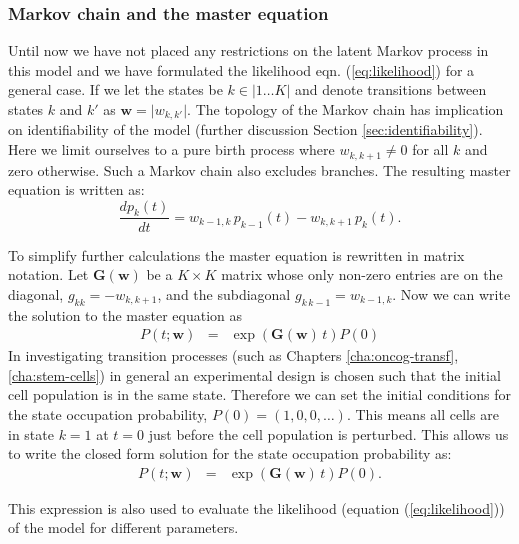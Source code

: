 \subsubsection{Markov chain and the master equation}
\label{sec:markov-chain-master}

Until now we have not placed any restrictions on the latent Markov process in this model and we have formulated the
likelihood eqn. (\ref{eq:likelihood}) for a general case. If we let the states be $k \in \lvert 1 \ldots K \rvert$ and denote transitions between states $k$ and $k'$ as $\mathbf{w} = \lvert w_{k,k'} \rvert$. 
The topology of the Markov chain has implication on identifiability of the model (further discussion Section \ref{sec:identifiability}). Here we limit ourselves to a pure birth process where $w_{k,k+1} \ne 0$ for all $k$ and zero otherwise. Such a Markov chain also excludes branches. The resulting master equation is written as:
\begin{equation}
  \label{eq:master}
  \frac{d p_k(t)}{dt} = w_{k-1,k}\, p_{k-1}(t) - w_{k,k+1}\, p_k(t).
\end{equation}

To simplify further calculations the master equation is rewritten in matrix notation. Let $\mathbf{G}(\mathbf{w})$ be a $K \times K$ matrix whose only non-zero entries are on the diagonal, $g_{kk}=-w_{k,k+1}$, and the subdiagonal $ g_{k\,k-1}=w_{k-1,k}$. Now we can write the solution to the master equation as
\begin{eqnarray}
  \label{eq:masterMat}
  P(t; \mathbf{w}) &=& \exp{\left(\mathbf{G}(\mathbf{w})\,t \right) } {P}(0)
\end{eqnarray} 
In investigating transition processes (such as Chapters \ref{cha:oncog-transf}, \ref{cha:stem-cells}) in general an experimental design is chosen such that the initial cell population is in the same state. Therefore we can set the initial conditions for the state occupation probability, $P(0) = (1, 0 , 0, \ldots)$. This means all cells are in state $k=1$ at $t=0$ just before the cell population is perturbed. This allows us to write the closed form solution for the state occupation probability as:
\begin{eqnarray}
  \label{eq:state-occ}
  P(t; \mathbf{w}) &= & \exp{\left(\mathbf{G}(\mathbf{w})\,t \right) } {P}(0).
\end{eqnarray}

This expression is also used to evaluate the likelihood (equation (\ref{eq:likelihood})) of the model for different parameters.

